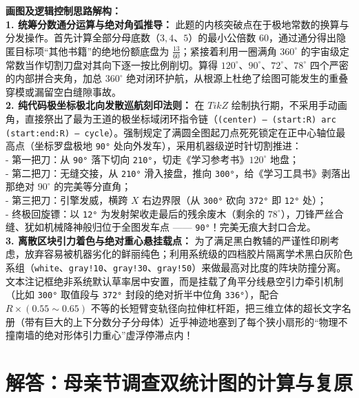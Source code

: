 \vspace{0.4cm}
{\small\color{blue!70!black}
\textbf{画图及逻辑控制思路解构：}\\
\textbf{1. 统筹分数通分运算与绝对角弧推导：} 此题的内核突破点在于极地常数的换算与分发操作。首先计算全部分母底数（$3, 4$、$5$）的最小公倍数 60，通过通分得出隐匿目标项“其他书籍”的绝地份额底盘为 $\frac{13}{60}$；紧接着利用一圈满角 $360^\circ$ 的宇宙级定常数当作切割刀盘对其向下逐一按比例削切。算得 $120^\circ$、$90^\circ、72^\circ$、$78^\circ$ 四个严密的内部拼合夹角，加总 $360^\circ$ 绝对闭环护航，从根源上杜绝了绘图可能发生的重叠穿模或漏留空白缝隙事故。\\
\textbf{2. 纯代码极坐标极北向发散巡航刻印法则：} 在 $TikZ$ 绘制执行期，不采用手动画角，直接祭出了最为王道的极坐标域闭环指令链（\texttt{(center) -- (start:R) arc (start:end:R) -- cycle}）。强制规定了满圆全图起刀点死死锁定在正中心轴位最高点（坐标罗盘极地 \texttt{90°} 处向外发车），采用机器级逆时针切割推进：\\
- 第一把刀：从 \texttt{90°} 落下切向 \texttt{210°}，切走《学习参考书》$120^\circ$ 地盘；\\
- 第二把刀：无缝交接，从 \texttt{210°} 滑入接盘，推向 \texttt{300°}，给《学习工具书》剥落出那绝对 $90^\circ$ 的完美等分直角；\\
- 第三把刀：引擎发威，横跨 $X$ 右边界限（从 \texttt{300°} 砍向 \texttt{372°} 即 \texttt{12°} 处）；\\
- 终极回旋镖：以 \texttt{12°} 为发射架收走最后的残余废木（剩余的 $78^\circ$），刀锋严丝合缝、犹如机械降神般归位于全图发车点 —— \texttt{90°}！完美无痕大封口合龙。\\
\textbf{3. 离散区块引力着色与绝对重心悬挂载点：} 为了满足黑白教辅的严谨性印刷考虑，放弃容易被机器劣化的鲜丽纯色；利用系统级的四档胶片隔离学术黑白灰阶色系组（\texttt{white}、\texttt{gray!10}、\texttt{gray!30}、\texttt{gray!50}）来做最高对比度的阵块防撞分离。文本注记框绝非系统默认草率居中安置，而是挂载了角平分线悬空引力牵引机制（比如 \texttt{300°} 取值段与 \texttt{372°} 封段的绝对折半中位角 \texttt{336°}），配合 $R \times (0.55\sim 0.65)$ 不等的长短臂变轨径向拉伸杠杆距，把三维立体的超长文字名册（带有巨大的上下分数分子分母体）近乎神迹地塞到了每个狭小扇形的“物理不撞南墙的绝对形体引力重心”虚浮停滞点内！
}

\newpage



\section{解答：母亲节调查双统计图的计算与复原}

